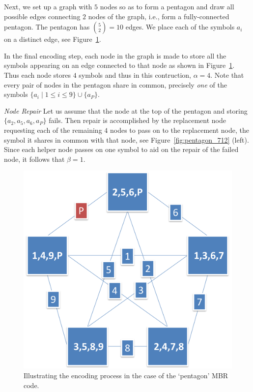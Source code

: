 \begin{multicols}{2}
Next, we set up a graph with $5$ nodes so as to form a pentagon and draw all possible edges connecting $2$ nodes of the graph, i.e., form a fully-connected pentagon. The pentagon has ${5 \choose 2}=10$ edges.  We place each of the symbols $a_i$ on a distinct edge, see Figure~\ref{fig:pentagon}.

In the final encoding step, each node in the graph is made to store all the symbols appearing on an edge connected to that node as shown in Figure~\ref{fig:pentagon}. Thus each node stores $4$ symbols and thus in this contruction, $\alpha=4$.  Note that every pair of nodes in the pentagon share in common, precisely {\em one} of the symbols $\{a_i \mid 1 \leq i \leq 9\} \cup \{a_P\}$.

{\em Node Repair} Let us assume that the node at the top of the pentagon and storing $\{a_2,a_5,a_6,a_P\}$ fails.  Then repair is accomplished by the replacement node requesting each of the remaining $4$ nodes to pass on to the replacement node, the symbol it shares in common with that node, see Figure~\ref{fig:pentagon_712} (left).  Since each helper node passes on one symbol to aid on the repair of the failed node, it follows that $\beta=1$.


\begin{figure}[H]
\centering
\includegraphics{src/Figures/chap4/pentagon.jpg}  
\caption{Illustrating the encoding process in the case of the `pentagon' MBR code.}  \label{fig:pentagon}    
\end{figure}



\end{multicols}
